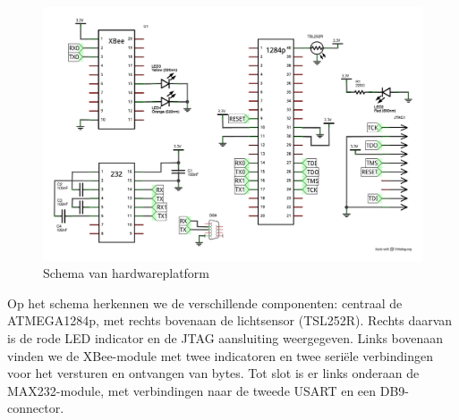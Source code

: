 \begin{figure}[ht]
  \centering
  \includegraphics[width=\linewidth]{resources/hardware-platform-schematic.pdf}
  \caption{Schema van hardwareplatform}
  \label{fig:hardware-platform-schematic}
\end{figure}

Op het schema herkennen we de verschillende componenten: centraal de
ATMEGA1284p, met rechts bovenaan de lichtsensor (TSL252R). Rechts daarvan is de
rode LED indicator en de JTAG aansluiting weergegeven. Links bovenaan vinden we
de XBee-module met twee indicatoren en twee seri\"ele verbindingen voor het
versturen en ontvangen van bytes. Tot slot is er links onderaan de
MAX232-module, met verbindingen naar de tweede USART en een DB9-connector.
